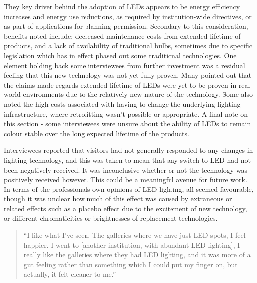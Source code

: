 They key driver behind the adoption of \Glspl{LED} appears to be energy efficiency increases and energy use reductions, as required by institution-wide directives, or as part of applications for planning permission. Secondary to this consideration, benefits noted include: decreased maintenance costs from extended lifetime of products, and a lack of availability of traditional bulbs, sometimes due to specific legislation which has in effect phased out some traditional technologies. One element holding back some interviewees from further investment was a residual feeling that this new technology was not yet fully proven. Many pointed out that the claims made regards extended lifetime of \Glspl{LED} were yet to be proven in real world environments due to the relatively new nature of the technology. Some also noted the high costs associated with having to change the underlying lighting infrastructure, where retrofitting wasn't possible or appropriate. A final note on this section - some interviewees were unsure about the ability of \Glspl{LED} to remain colour stable over the long expected lifetime of the products.

Interviewees reported that visitors had not generally responded to any changes in lighting technology, and this was taken to mean that any switch to \gls{LED} had not been negatively received. It was inconclusive whether or not the technology was positively received however. This could be a meaningful avenue for future work. In terms of the professionals own opinions of \gls{LED} lighting, all seemed favourable, though it was unclear how much of this effect was caused by extraneous or related effects such as a placebo effect due to the excitement of new technology, or different chromaticities or brightnesses of replacement technologies.  

\begin{quote}
``I like what I've seen. The galleries where we have just \gls{LED} spots, I feel happier. I went to [another institution, with abundant \gls{LED} lighting], I really like the galleries where they had \gls{LED} lighting, and it was more of a gut feeling rather than something which I could put my finger on, but actually, it felt cleaner to me.''
\end{quote}

